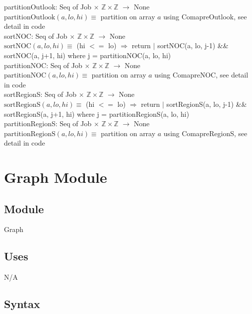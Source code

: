 \documentclass[12pt]{article}
\begin{document}
\noindent partitionOutlook: Seq of Job $\times$ $\mathbb{Z} \times \mathbb{Z}$ $ \rightarrow $ None\\
\noindent $\mbox{partitionOutlook}(a, lo, hi) \equiv$ partition on array $a$ using ComapreOutlook, see detail in code\\

\noindent sortNOC: Seq of Job $\times$ $\mathbb{Z} \times \mathbb{Z}$ $ \rightarrow $ None\\
\noindent $\mbox{sortNOC}(a, lo, hi) \equiv$ (hi $<=$ lo) $\Rightarrow$ return $|$ sortNOC(a, lo, j-1) \&\& sortNOC(a, j+1, hi) where j = partitionNOC(a, lo, hi)\\

\noindent partitionNOC: Seq of Job $\times$ $\mathbb{Z} \times \mathbb{Z}$ $ \rightarrow $ None\\
\noindent $\mbox{partitionNOC}(a, lo, hi) \equiv$ partition on array $a$ using ComapreNOC, see detail in code\\

\noindent sortRegionS: Seq of Job $\times$ $\mathbb{Z} \times \mathbb{Z}$ $ \rightarrow $ None\\
\noindent $\mbox{sortRegionS}(a, lo, hi) \equiv$ (hi $<=$ lo) $\Rightarrow$ return $|$ sortRegionS(a, lo, j-1) \&\& sortRegionS(a, j+1, hi) where j = partitionRegionS(a, lo, hi)\\

\noindent partitionRegionS: Seq of Job $\times$ $\mathbb{Z} \times \mathbb{Z}$ $ \rightarrow $ None\\
\noindent $\mbox{partitionRegionS}(a, lo, hi) \equiv$ partition on array $a$ using ComapreRegionS, see detail in code\\
\newpage

\section* {Graph Module}

\subsection*{Module}

Graph

\subsection* {Uses}

N/A

\subsection* {Syntax}
\end{document}
